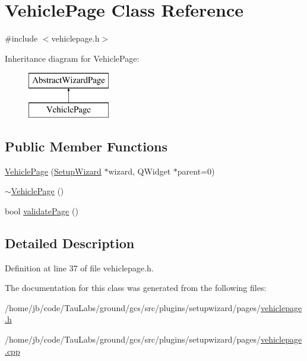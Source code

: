 \hypertarget{class_vehicle_page}{\section{\-Vehicle\-Page \-Class \-Reference}
\label{class_vehicle_page}
}


{\ttfamily \#include $<$vehiclepage.\-h$>$}

\-Inheritance diagram for \-Vehicle\-Page\-:\begin{figure}[H]
\begin{center}
\leavevmode
\includegraphics[height=2.000000cm]{class_vehicle_page}
\end{center}
\end{figure}
\subsection*{\-Public \-Member \-Functions}
\begin{DoxyCompactItemize}
\item 
\hyperlink{group___vehicle_page_ga974bbc2be70acc6ef6f222f2dbbacfc5}{\-Vehicle\-Page} (\hyperlink{class_setup_wizard}{\-Setup\-Wizard} $\ast$wizard, \-Q\-Widget $\ast$parent=0)
\item 
\hyperlink{group___vehicle_page_ga6044822bdc1c4412b29020cdac183d9f}{$\sim$\-Vehicle\-Page} ()
\item 
bool \hyperlink{group___vehicle_page_gacce2096fe1c6fff28ae7ff25dfe75e37}{validate\-Page} ()
\end{DoxyCompactItemize}


\subsection{\-Detailed \-Description}


\-Definition at line 37 of file vehiclepage.\-h.



\-The documentation for this class was generated from the following files\-:\begin{DoxyCompactItemize}
\item 
/home/jb/code/\-Tau\-Labs/ground/gcs/src/plugins/setupwizard/pages/\hyperlink{vehiclepage_8h}{vehiclepage.\-h}\item 
/home/jb/code/\-Tau\-Labs/ground/gcs/src/plugins/setupwizard/pages/\hyperlink{vehiclepage_8cpp}{vehiclepage.\-cpp}\end{DoxyCompactItemize}
